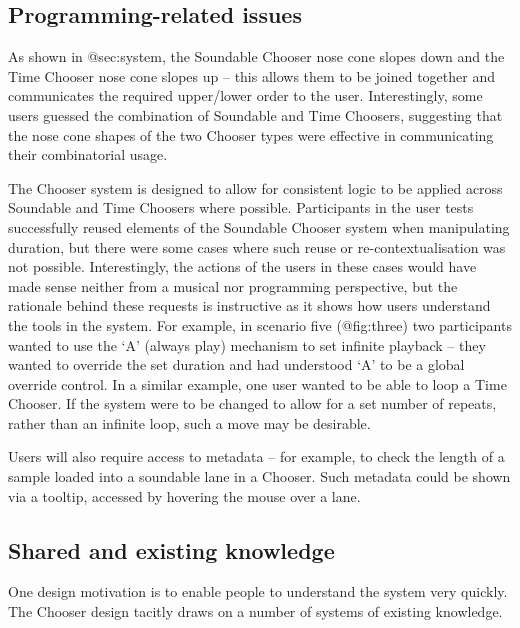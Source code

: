 \documentclass[]{article}
\begin{document}
\hypertarget{programming-related-issues}{%
\subsection{Programming-related
issues}\label{programming-related-issues}}

As shown in @sec:system, the Soundable Chooser nose cone slopes down and
the Time Chooser nose cone slopes up -- this allows them to be joined
together and communicates the required upper/lower order to the user.
Interestingly, some users guessed the combination of Soundable and Time
Choosers, suggesting that the nose cone shapes of the two Chooser types
were effective in communicating their combinatorial usage.

The Chooser system is designed to allow for consistent logic to be
applied across Soundable and Time Choosers where possible. Participants
in the user tests successfully reused elements of the Soundable Chooser
system when manipulating duration, but there were some cases where such
reuse or re-contextualisation was not possible. Interestingly, the
actions of the users in these cases would have made sense neither from a
musical nor programming perspective, but the rationale behind these
requests is instructive as it shows how users understand the tools in
the system. For example, in scenario five (@fig:three) two participants
wanted to use the `A' (always play) mechanism to set infinite playback
-- they wanted to override the set duration and had understood `A' to be
a global override control. In a similar example, one user wanted to be
able to loop a Time Chooser. If the system were to be changed to allow
for a set number of repeats, rather than an infinite loop, such a move
may be desirable.

Users will also require access to metadata -- for example, to check the
length of a sample loaded into a soundable lane in a Chooser. Such
metadata could be shown via a tooltip, accessed by hovering the mouse
over a lane.

\hypertarget{shared-and-existing-knowledge}{%
\subsection{Shared and existing
knowledge}\label{shared-and-existing-knowledge}}

One design motivation is to enable people to understand the system very
quickly. The Chooser design tacitly draws on a number of systems of
existing knowledge.
\end{document}
